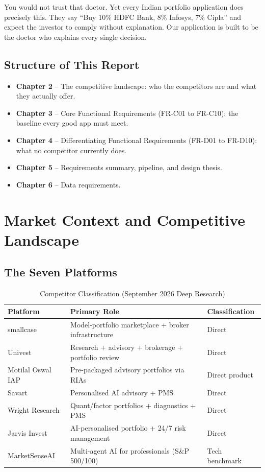 \documentclass[12pt, a4paper, openany, oneside]{report}
\begin{document}
You would not trust that doctor. Yet every Indian portfolio application does precisely this. They say ``Buy 10\% HDFC Bank, 8\% Infosys, 7\% Cipla'' and expect the investor to comply without explanation. Our application is built to be the doctor who explains every single decision.


\section{Structure of This Report}

\begin{itemize}
  \item \textbf{Chapter 2} -- The competitive landscape: who the competitors are and what they actually offer.
  \item \textbf{Chapter 3} -- Core Functional Requirements (FR-C01 to FR-C10): the baseline every good app must meet.
  \item \textbf{Chapter 4} -- Differentiating Functional Requirements (FR-D01 to FR-D10): what no competitor currently does.
  \item \textbf{Chapter 5} -- Requirements summary, pipeline, and design thesis.
  \item \textbf{Chapter 6} -- Data requirements.
\end{itemize}

\chapter{Market Context and Competitive Landscape}

\section{The Seven Platforms}

\begin{table}[H]
\centering
\caption{Competitor Classification (September 2026 Deep Research)}
\label{tab:competitors}
\begin{tabularx}{\textwidth}{|l|X|l|}
\hline
\textbf{Platform} & \textbf{Primary Role} & \textbf{Classification} \\
\hline
smallcase & Model-portfolio marketplace + broker infrastructure & Direct \\
Univest & Research + advisory + brokerage + portfolio review & Direct \\
Motilal Oswal IAP & Pre-packaged advisory portfolios via RIAs & Direct product \\
Savart & Personalised AI advisory + PMS & Direct \\
Wright Research & Quant/factor portfolios + diagnostics + PMS & Direct \\
Jarvis Invest & AI-personalised portfolio + 24/7 risk management & Direct \\
MarketSenseAI & Multi-agent AI for professionals (S\&P 500/100) & Tech benchmark \\
\hline
\end{tabularx}
\end{table}
\end{document}
